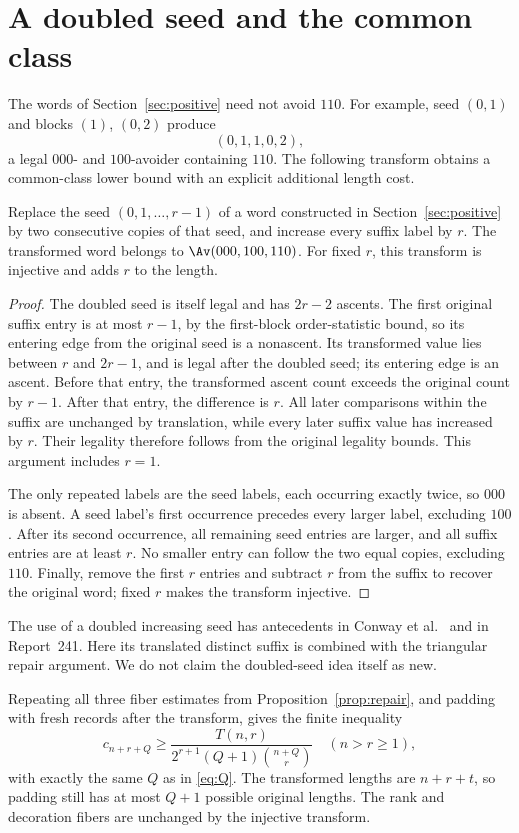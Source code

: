 \section{A doubled seed and the common class}\label{sec:common}
The words of Section~\ref{sec:positive} need not avoid $110$. For example, seed $(0,1)$ and blocks $(1)$, $(0,2)$ produce
\[
 (0,1,1,0,2),
\]
a legal $000$- and $100$-avoider containing $110$. The following transform obtains a common-class lower bound with an explicit additional length cost.

\begin{lemma}\label{lem:doubling}
Replace the seed $(0,1,\ldots,r-1)$ of a word constructed in Section~\ref{sec:positive} by two consecutive copies of that seed, and increase every suffix label by $r$. The transformed word belongs to $\Av(000,100,110)$. For fixed $r$, this transform is injective and adds $r$ to the length.
\end{lemma}
\begin{proof}
The doubled seed is itself legal and has $2r-2$ ascents. The first original suffix entry is at most $r-1$, by the first-block order-statistic bound, so its entering edge from the original seed is a nonascent. Its transformed value lies between $r$ and $2r-1$, and is legal after the doubled seed; its entering edge is an ascent. Before that entry, the transformed ascent count exceeds the original count by $r-1$. After that entry, the difference is $r$. All later comparisons within the suffix are unchanged by translation, while every later suffix value has increased by $r$. Their legality therefore follows from the original legality bounds. This argument includes $r=1$.

The only repeated labels are the seed labels, each occurring exactly twice, so $000$ is absent. A seed label's first occurrence precedes every larger label, excluding $100$. After its second occurrence, all remaining seed entries are larger, and all suffix entries are at least $r$. No smaller entry can follow the two equal copies, excluding $110$. Finally, remove the first $r$ entries and subtract $r$ from the suffix to recover the original word; fixed $r$ makes the transform injective.
\end{proof}
The use of a doubled increasing seed has antecedents in Conway et al.\ \cite[Section~7]{conway} and in Report~241. Here its translated distinct suffix is combined with the triangular repair argument. We do not claim the doubled-seed idea itself as new.

Repeating all three fiber estimates from Proposition~\ref{prop:repair}, and padding with fresh records after the transform, gives the finite inequality
\begin{equation}\label{eq:commonfinite}
 c_{n+r+Q}\ge
 \frac{T(n,r)}{2^{r+1}(Q+1)\binom{n+Q}{r}}
 \quad(n>r\ge1),
\end{equation}
with exactly the same $Q$ as in \eqref{eq:Q}. The transformed lengths are $n+r+t$, so padding still has at most $Q+1$ possible original lengths. The rank and decoration fibers are unchanged by the injective transform.

